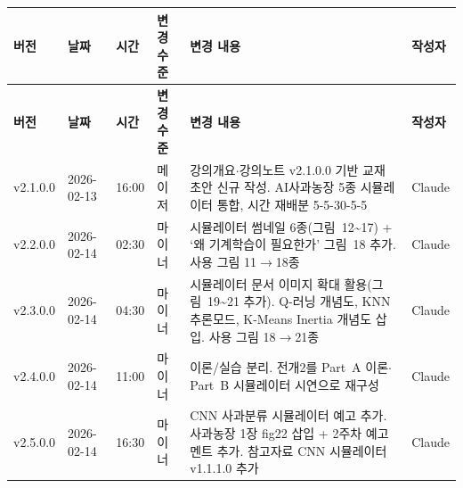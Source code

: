 \documentclass[11pt,a4paper]{article}
\renewcommand{\arraystretch}{1.4}
\begin{document}
\begin{center}
\renewcommand{\arraystretch}{1.3}
\begin{longtable}{|l|l|l|l|p{5.5cm}|l|}
\hline
\rowcolor{tableheader}
\textbf{버전} & \textbf{날짜} & \textbf{시간} & \textbf{변경 수준} & \textbf{변경 내용} & \textbf{작성자} \\
\hline
\endfirsthead
\hline
\rowcolor{tableheader}
\textbf{버전} & \textbf{날짜} & \textbf{시간} & \textbf{변경 수준} & \textbf{변경 내용} & \textbf{작성자} \\
\hline
\endhead
v2.1.0.0 & 2026-02-13 & 16:00 & 메이저 & 강의개요$\cdot$강의노트 v2.1.0.0 기반 교재 초안 신규 작성. AI사과농장 5종 시뮬레이터 통합, 시간 재배분 5-5-30-5-5 & Claude \\
\hline
v2.2.0.0 & 2026-02-14 & 02:30 & 마이너 & 시뮬레이터 썸네일 6종(그림~12\textasciitilde 17) + `왜 기계학습이 필요한가' 그림~18 추가. 사용 그림 11$\to$18종 & Claude \\
\hline
v2.3.0.0 & 2026-02-14 & 04:30 & 마이너 & 시뮬레이터 문서 이미지 확대 활용(그림~19\textasciitilde 21 추가). Q-러닝 개념도, KNN 추론모드, K-Means Inertia 개념도 삽입. 사용 그림 18$\to$21종 & Claude \\
\hline
v2.4.0.0 & 2026-02-14 & 11:00 & 마이너 & 이론/실습 분리. 전개2를 Part~A 이론$\cdot$Part~B 시뮬레이터 시연으로 재구성 & Claude \\
\hline
v2.5.0.0 & 2026-02-14 & 16:30 & 마이너 & CNN 사과분류 시뮬레이터 예고 추가. 사과농장 1장 fig22 삽입 + 2주차 예고 멘트 추가. 참고자료 CNN 시뮬레이터 v1.1.1.0 추가 & Claude \\
\hline
\end{longtable}
\end{center}
\end{document}
